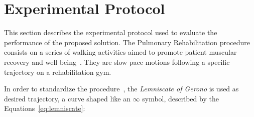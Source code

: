 \documentclass[journal]{IEEEtran}
\begin{document}





\section{Experimental Protocol} \label{experimental}

This section describes the experimental protocol used to evaluate the performance of the proposed solution.  The Pulmonary Rehabilitation procedure consists on a series of walking activities aimed to promote patient muscular recovery and well being~\cite{Wu2012}. They are slow pace motions following a specific trajectory on a rehabilitation gym.

In order to standardize the procedure~\cite{Sprunk2016}, the \textit{Lemniscate of Gerono} is used as desired trajectory, a curve shaped like an $\infty$ symbol, described by the Equations~\ref{eq:lemniscate}:
\end{document}
